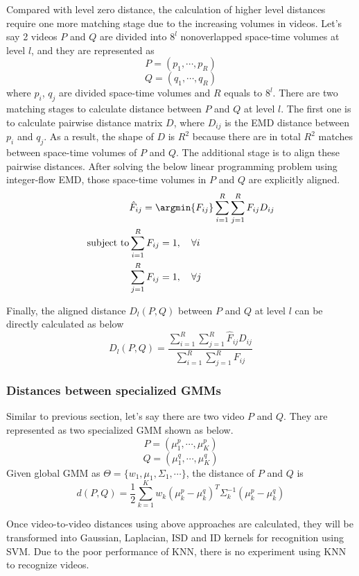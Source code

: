 	\noindent Compared with level zero distance, the calculation of higher level distances require one more matching stage due to the increasing volumes in videos. Let's say 2 videos $P$ and $Q$ are divided into $8^l$ nonoverlapped space-time volumes at level $l$, and they are represented as
	$$P = (p_1, \cdots, p_R)$$
	$$Q = (q_1, \cdots, q_R)$$
	where $p_i$, $q_j$ are divided space-time volumes and $R$ equals to $8^l$. There are two matching stages to calculate distance between $P$ and $Q$ at level $l$. The first one is to calculate pairwise distance matrix $D$, where $D_{ij}$ is the EMD distance between $p_i$ and $q_j$. As a result, the shape of $D$ is $R^2$ because there are in total $R^2$ matches between space-time volumes of $P$ and $Q$. The additional stage is to align these pairwise distances. After solving the below linear programming problem using integer-flow EMD, those space-time volumes in $P$ and $Q$ are explicitly aligned. 
	\begin{eqnarray}
	& \hat F_{ij} = \argmin{F_{ij}} \sum_{i = 1}^{R} \sum_{j=1}^{R} F_{ij} D_{ij}
	\nonumber \\
	\text{subject to} & \sum_{i=1}^{R} F_{ij} = 1, \quad \forall i \nonumber\\
	&\sum_{j=1}^{R} F_{ij} = 1, \quad \forall j
	\end{eqnarray}

	\noindent Finally, the aligned distance $D_l(P,Q)$ between $P$ and $Q$ at level $l$ can be directly calculated as below
	\begin{equation}
	D_l(P,Q) = \frac{\sum_{i=1}^R \sum_{j=1}^R \hat F_{ij} D_{ij}}{\sum_{i=1}^R \sum_{j=1}^R F_{ij}}
	\end{equation}

	\subsubsection{Distances between specialized GMMs}
	Similar to previous section, let's say there are two video $P$ and $Q$. They are represented as two specialized GMM shown as below.
	$$P = (\mu_1^p, \cdots, \mu_K^p)$$
	$$Q = (\mu_1^q, \cdots, \mu_K^q)$$
	Given global GMM as $\Theta = \{w_1, \mu_1, \Sigma_1, \cdots\}$, the distance of $P$ and $Q$ is
	\begin{equation}
	d(P,Q) = \frac{1}{2} \sum_{k= 1}^{K} w_k (\mu_k^p - \mu_k^q)^T \Sigma_k^{-1} (\mu_k^p - \mu_k^q)
	\end{equation}

\noindent Once video-to-video distances using above approaches are calculated, they will be transformed into Gaussian, Laplacian, ISD and ID kernels for recognition using SVM. Due to the poor performance of KNN, there is no experiment using KNN to recognize videos. 


